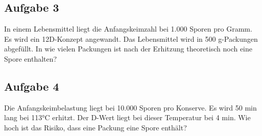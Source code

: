 \documentclass[a4paper,11pt]{article}
\newif\ifshowme
\begin{document}
\subsection*{Aufgabe 3}
In einem Lebensmittel liegt die Anfangskeimzahl bei 1.000 Sporen pro Gramm. Es wird ein 12D-Konzept angewandt. Das Lebensmittel wird in 500 g-Packungen abgefüllt. 
\pp
In wie vielen Packungen ist nach der Erhitzung theoretisch noch eine Spore enthalten?

\ifshowme
\antwort{

Sporen pro Gramm:
\begin{align*}
1000 ~(\text{Sporen} /\text{g}) \cdot 10^{-12} = 10^{-9} ~(\text{Sporen} /\text{g})
\end{align*}
Sporen pro 500 g - Packung:
\begin{align*}
10^{-9} \cdot 500 ~\text{g} = \frac{1}{2.000.000}
\end{align*}
In einer von 2 Millionen Packungen ist noch eine Spore enthalten.
}
\else
\fi


\subsection*{Aufgabe 4}
Die Anfangskeimbelastung liegt bei 10.000 Sporen pro Konserve. Es wird 50 min lang bei
113°C erhitzt. Der D-Wert liegt bei dieser Temperatur bei 4 min. 
\pp 
Wie hoch ist das Risiko, dass eine Packung eine Spore enthält?


\ifshowme
\antwort{
Formel aus Food Processing Handbook, S.35:
\begin{align}
\frac{\text{Heating Time}}{D_T} &= \log(\frac{N_0}{N}) 
\end{align}
Zunächst potenzieren wir um den Logarithmus umstellen zu können:
\begin{align*}
10^{\frac{\text{Heating Time}}{D_T}} &= \frac{N_0}{N} \\
N &= \frac{N_0}{10^{\frac{\text{Heating Time}}{D_T}}}
\end{align*}
Werte einsetzen:
\begin{align*}
N &= \frac{10.000}{10^{\frac{\text{50 ~\text{min}}}{4 ~\text{min}}}} \\
 &= 3,16 \cdot 10^{-9}
\end{align*}
Anzahl der Konserven, die geöffnet werden müssen um eine Spore zu finden:
\begin{align*}
\frac{1}{3,16 \cdot 10^{-9}} = 3,16 \cdot 10^{8}
\end{align*}
}
\else
\fi
\end{document}

